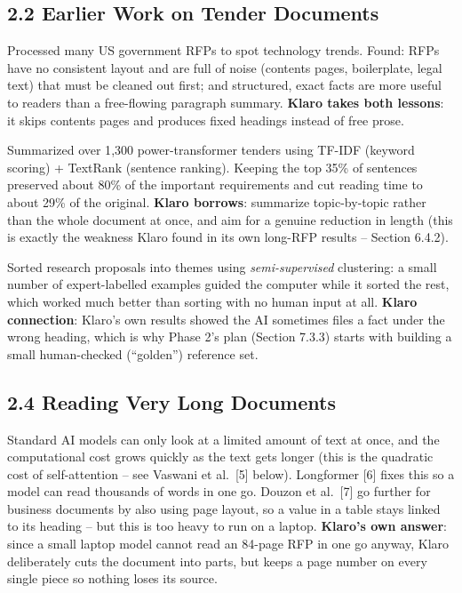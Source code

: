 \documentclass[11pt,a4paper]{article}
\begin{document}
\subsection*{2.2 Earlier Work on Tender Documents}
\begin{description}[leftmargin=2.6cm,style=nextline]
  \item[Beason et al.\ {[1]}] Processed many US government RFPs to spot technology trends. Found:
    RFPs have no consistent layout and are full of noise (contents pages, boilerplate, legal
    text) that must be cleaned out first; and structured, exact facts are more useful to readers
    than a free-flowing paragraph summary. \textbf{Klaro takes both lessons}: it skips contents
    pages and produces fixed headings instead of free prose.
  \item[Trappey et al.\ {[2]}] Summarized over 1{,}300 power-transformer tenders using TF-IDF
    (keyword scoring) + TextRank (sentence ranking). Keeping the top 35\% of sentences preserved
    about 80\% of the important requirements and cut reading time to about 29\% of the original.
    \textbf{Klaro borrows}: summarize topic-by-topic rather than the whole document at once, and aim
    for a genuine reduction in length (this is exactly the weakness Klaro found in its own long-RFP
    results -- Section 6.4.2).
  \item[Knisely \& Pavliscsak {[4]}] Sorted research proposals into themes using
    \emph{semi-supervised} clustering: a small number of expert-labelled examples guided the
    computer while it sorted the rest, which worked much better than sorting with no human input at
    all. \textbf{Klaro connection}: Klaro's own results showed the AI sometimes files a fact under
    the wrong heading, which is why Phase 2's plan (Section 7.3.3) starts with building a small
    human-checked (``golden'') reference set.
\end{description}

\subsection*{2.4 Reading Very Long Documents}
Standard AI models can only look at a limited amount of text at once, and the computational cost
grows quickly as the text gets longer (this is the quadratic cost of self-attention -- see Vaswani
et al.\ [5] below). Longformer [6] fixes this so a model can read thousands of words in one go.
Douzon et al.\ [7] go further for business documents by also using page layout, so a value in a table
stays linked to its heading -- but this is too heavy to run on a laptop. \textbf{Klaro's own answer}:
since a small laptop model cannot read an 84-page RFP in one go anyway, Klaro deliberately cuts the
document into parts, but keeps a page number on every single piece so nothing loses its source.
\end{document}
